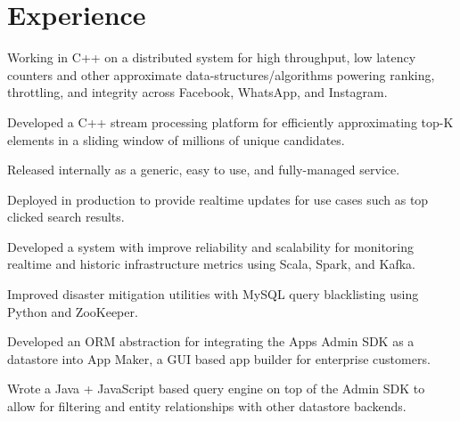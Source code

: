 \documentclass[]{resume}
\begin{document}
\begin{minipage}[t]{0.66\textwidth}


\section{Experience}

\vspace{\topsep} %
\begin{tightemize}
\item Working in C++ on a distributed system for high throughput, low latency counters and other approximate data-structures/algorithms powering ranking, throttling, and integrity across Facebook, WhatsApp, and Instagram.
\end{tightemize}
\sectionsep

\begin{tightemize}
\item Developed a C++ stream processing platform for efficiently approximating top-K elements in a sliding window of millions of unique candidates.
\item Released internally as a generic, easy to use, and fully-managed service.
\item Deployed in production to provide realtime updates for use cases such as top clicked search results.
\end{tightemize}
\sectionsep

\begin{tightemize}
\item Developed a system with improve reliability and scalability for monitoring realtime and historic infrastructure metrics using Scala, Spark, and Kafka.
\item Improved disaster mitigation utilities with MySQL query blacklisting using Python and ZooKeeper.
\end{tightemize}
\sectionsep

\begin{tightemize}
\item Developed an ORM abstraction for integrating the Apps Admin SDK as a datastore into App Maker, a GUI based app builder for enterprise customers.
\item Wrote a Java + JavaScript based query engine on top of the Admin SDK to allow for filtering and entity relationships with other datastore backends.
\end{tightemize}
\sectionsep


\end{minipage}
\end{document}
